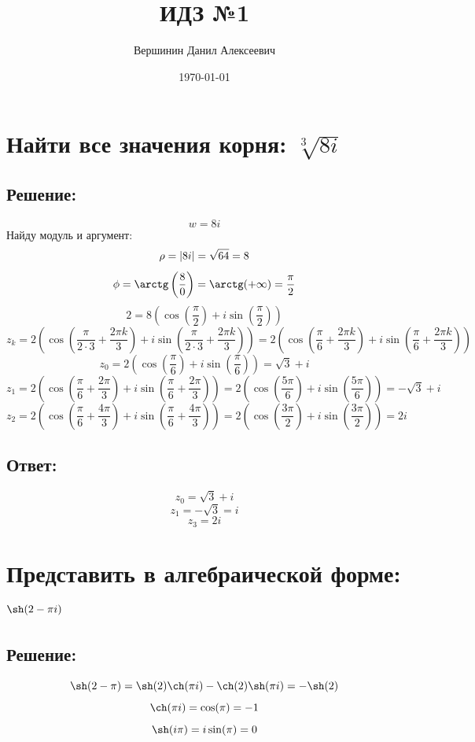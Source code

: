 \documentclass{article}
\title{\vspace{-1cm}ИДЗ №1}
\author{Вершинин Данил Алексеевич}
\date{\today}
\begin{document}
	
	\maketitle
	\section{Найти все значения корня: $\sqrt[3]{8i}$}
	\subsection{Решение:}
	\[w= 8i\]
	Найду модуль и аргумент:
	\[\rho = |8i| = \sqrt{64} = 8 \\ \]
	\[\phi = \arctg\left(\frac{8}{0}\right) = \arctg(+\infty) = \frac{\pi}{2}\]
	\[2 = 8(\cos\left(\frac{\pi}{2}\right) + i \sin\left(\frac{\pi}{2}\right))\]
	\[z_k = 2 \left(\cos\left(\frac{\pi }{2\cdot 3} + \frac{2\pi k}{3}\right) + i \sin\left(\frac{\pi }{2\cdot 3} + \frac{2\pi k}{3}\right)\right) = 2 \left(\cos\left(\frac{\pi }{6} + \frac{2\pi k}{3}\right) + i \sin\left(\frac{\pi }{6} + \frac{2\pi k}{3}\right)\right)\]
	\[z_0 = 2 \left(\cos\left(\frac{\pi}{6}\right) + i \sin\left(\frac{\pi}{6}\right)\right) = \sqrt{3} + i\]
	\[z_1 = 2 \left(\cos\left(\frac{\pi}{6} + \frac{2\pi}{3}\right) + i \sin\left(\frac{\pi}{6} + \frac{2\pi}{3}\right)\right) = 2 \left(\cos\left(\frac{5\pi}{6}\right) + i \sin\left(\frac{5\pi}{6}\right)\right) = - \sqrt{3} + i\]
	\[z_2 = 2 \left(\cos\left(\frac{\pi}{6} + \frac{4\pi}{3}\right) + i \sin\left(\frac{\pi}{6} + \frac{4\pi}{3}\right)\right) = 2 \left(\cos\left(\frac{3\pi}{2}\right) + i \sin\left(\frac{3\pi}{2}\right)\right) = 2i\]
	\subsection{Ответ:}
	\[z_0 = \sqrt{3} + i\]
	\[z_1 = - \sqrt{3} = i\]
	\[z_3 = 2i\]
	
	\section{Представить в алгебраической форме: $\sh(2-\pi i)$}
	\subsection{Решение:}
	\[\sh(2-\pi) = \sh(2)\ch(\pi i) - \ch(2)\sh(\pi i) = -\sh(2)\]
	\[\ch(\pi i) = \cos(\pi) = -1\]
	\[\sh(i\pi) = i \sin(\pi) = 0\]
\end{document}
